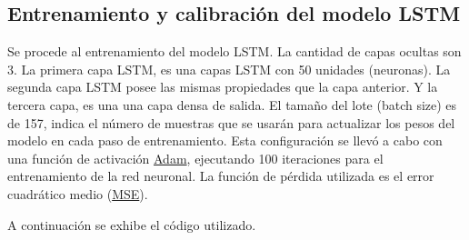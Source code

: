 \documentclass[
  us-letterpaper,
]{scrreprt}
\theoremstyle{plain}
\theoremstyle{definition}
\theoremstyle{definition}
\theoremstyle{remark}
\begin{document}
\subsection{Entrenamiento y calibración del modelo
LSTM}\label{entrenamiento-y-calibraciuxf3n-del-modelo-lstm}

Se procede al entrenamiento del modelo LSTM. La cantidad de capas
ocultas son 3. La primera capa LSTM, es una capas LSTM con 50 unidades
(neuronas). La segunda capa LSTM posee las mismas propiedades que la
capa anterior. Y la tercera capa, es una una capa densa de salida. El
tamaño del lote (batch size) es de 157, indica el número de muestras que
se usarán para actualizar los pesos del modelo en cada paso de
entrenamiento. Esta configuración se llevó a cabo con una función de
activación \hyperref[sec-Adam]{Adam}, ejecutando 100 iteraciones para el
entrenamiento de la red neuronal. La función de pérdida utilizada es el
error cuadrático medio (\hyperref[sec-MSE]{MSE}).

A continuación se exhibe el código utilizado.
\end{document}
